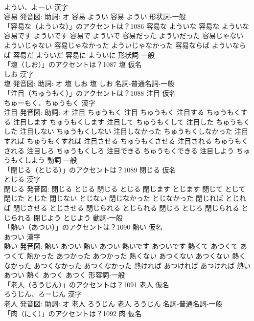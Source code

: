 \documentclass[8pt]{extreport}
\begin{document}
\begin{CJK}{UTF8}{min}
\\	ようい、よーい 漢字　
\\	容易 発音図: 助詞: オ	容易 ようい		容易 ようい				形状詞-一般 
\\	「容易な（よういな）」のアクセントは？1086		容易な よういな		容易な よういな 容易です よういです 容易で よういで 容易だった よういだった 容易じゃない よういじゃない 容易じゃなかった よういじゃなかった 容易ならば よういならば 容易だ よういだ 容易に よういに				形状詞-一般 
\\	「塩（しお）」のアクセントは？1087	塩 仮名　
\\	しお 漢字　
\\	塩 発音図: 助詞: オ	塩 しお		塩 しお				名詞-普通名詞-一般 
\\	「注目（ちゅうもく）」のアクセントは？1088	注目 仮名　
\\	ちゅーもく、ちゅうもく 漢字　
\\	注目 発音図: 助詞: オ	注目 ちゅうもく		注目 ちゅうもく 注目する ちゅうもくする 注目します ちゅうもくします 注目して ちゅうもくして 注目した ちゅうもくした 注目しない ちゅうもくしない 注目しなかった ちゅうもくしなかった 注目すれば ちゅうもくすれば 注目させる ちゅうもくさせる 注目される ちゅうもくされる 注目しろ ちゅうもくしろ 注目できる ちゅうもくできる 注目しよう ちゅうもくしよう				動詞-一般 
\\	「閉じる（とじる）」のアクセントは？1089	閉じる 仮名　
\\	とじる 漢字　
\\	閉じる 発音図:	閉じる とじる		閉じる とじる 閉じます とじます 閉じて とじて 閉じた とじた 閉じない とじない 閉じなかった とじなかった 閉じれば とじれば 閉じさせる とじさせる 閉じられる とじられる 閉じろ とじろ 閉じられる とじられる 閉じよう とじよう				動詞-一般 
\\	「熱い（あつい）」のアクセントは？1090	熱い 仮名　
\\	あつい 漢字　
\\	熱い 発音図:	熱い あつい		熱い あつい 熱いです あついです 熱くて あつくて あつくて 熱かった あつかった あつかった 熱くない あつくない あつくない 熱くなかった あつくなかった あつくなかった 熱ければ あつければ あつければ 熱い あつい 熱く あつく あつく				形容詞-一般 
\\	「老人（ろうじん）」のアクセントは？1091	老人 仮名　
\\	ろうじん、ろーじん 漢字　
\\	老人 発音図: 助詞: オ	老人 ろうじん		老人 ろうじん				名詞-普通名詞-一般 
\\	「肉（にく）」のアクセントは？1092	肉 仮名　

\end{CJK}
\end{document}
